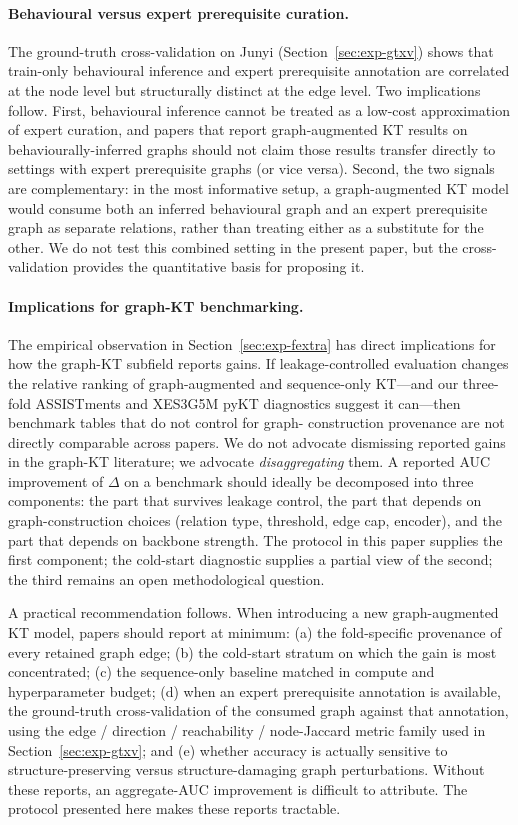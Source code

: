 \documentclass[pdflatex,sn-basic]{sn-jnl}
\begin{document}
\paragraph{Behavioural versus expert prerequisite curation.}
The ground-truth cross-validation on Junyi
(Section~\ref{sec:exp-gtxv}) shows that train-only behavioural
inference and expert prerequisite annotation are correlated at the
node level but structurally distinct at the edge level. Two
implications follow. First, behavioural inference cannot be treated
as a low-cost approximation of expert curation, and papers that
report graph-augmented KT results on behaviourally-inferred graphs
should not claim those results transfer directly to settings with
expert prerequisite graphs (or vice versa). Second, the two signals
are complementary: in the most informative setup, a graph-augmented
KT model would consume both an inferred behavioural graph and an
expert prerequisite graph as separate relations, rather than treating
either as a substitute for the other. We do not test this combined
setting in the present paper, but the cross-validation provides the
quantitative basis for proposing it.
\paragraph{Implications for graph-KT benchmarking.}
The empirical observation in Section~\ref{sec:exp-fextra} has direct
implications for how the graph-KT subfield reports gains. If
leakage-controlled evaluation changes the relative ranking of
graph-augmented and sequence-only KT---and our three-fold ASSISTments and XES3G5M pyKT diagnostics suggest it can---then benchmark tables that do not control for graph-
construction provenance are not directly comparable across papers. We
do not advocate dismissing reported gains in the graph-KT literature;
we advocate \emph{disaggregating} them. A reported AUC improvement of
$\Delta$ on a benchmark should ideally be decomposed into three
components: the part that survives leakage control, the part that
depends on graph-construction choices (relation type, threshold, edge
cap, encoder), and the part that depends on backbone strength. The
protocol in this paper supplies the first component; the cold-start
diagnostic supplies a partial view of the second; the third remains an
open methodological question.

A practical recommendation follows. When introducing a new
graph-augmented KT model, papers should report at minimum: (a) the
fold-specific provenance of every retained graph edge; (b) the
cold-start stratum on which the gain is most concentrated; (c) the
sequence-only baseline matched in compute and hyperparameter budget;
(d) when an expert prerequisite annotation is available, the
ground-truth cross-validation of the consumed graph against that
annotation, using the edge / direction / reachability / node-Jaccard
metric family used in Section~\ref{sec:exp-gtxv}; and (e) whether
accuracy is actually sensitive to structure-preserving versus
structure-damaging graph perturbations. Without these reports, an
aggregate-AUC improvement is difficult to attribute. The protocol
presented here makes these reports tractable.
\end{document}
